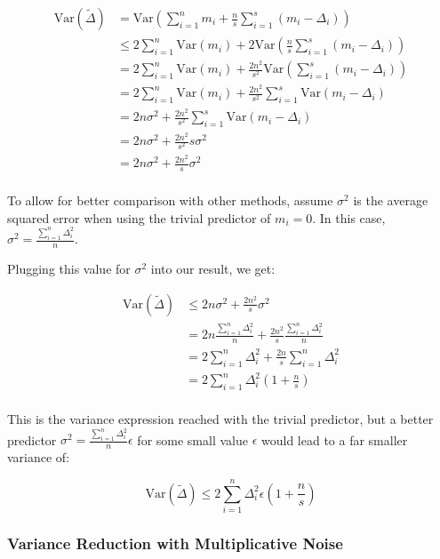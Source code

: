 \documentclass[11pt]{article}
\begin{document}
\[
\begin{aligned}
\mathrm{Var}(\tilde{\Delta}) &= \mathrm{Var}( \sum_{i = 1}^{n} m_i + \frac{n}{s} \sum_{i = 1}^{s} (m_i - \Delta_i)) \\
&\leq 2\sum_{i = 1}^{n} \mathrm{Var}(m_i) + 2\mathrm{Var}(\frac{n}{s} \sum_{i = 1}^{s} (m_i - \Delta_i)) \\
&= 2\sum_{i = 1}^{n} \mathrm{Var}(m_i) + \frac{2n^2}{s^2} \mathrm{Var}(\sum_{i = 1}^{s} (m_i - \Delta_i)) \\
&= 2\sum_{i = 1}^{n} \mathrm{Var}(m_i) + \frac{2n^2}{s^2} \sum_{i = 1}^{s} \mathrm{Var}(m_i - \Delta_i) \\
&= 2n \sigma^2 + \frac{2n^2}{s^2} \sum_{i = 1}^{s} \mathrm{Var}(m_i - \Delta_i) \\
&= 2n \sigma^2 + \frac{2n^2}{s^2} s \sigma^2 \\
&= 2n \sigma^2 + \frac{2n^2}{s} \sigma^2 \\
\end{aligned}
\]

To allow for better comparison with other methods, assume $\sigma^2$ is the average squared error when using the trivial predictor of $m_i = 0$.
In this case, $\sigma^2 = \frac{\sum_{i = 1}^{n}\Delta_i^2}{n}$.

Plugging this value for $\sigma^2$ into our result, we get:

\[
\begin{aligned}
\mathrm{Var}(\tilde{\Delta}) &\leq 2n \sigma^2 + \frac{2n^2}{s} \sigma^2 \\
&= 2n \frac{\sum_{i = 1}^{n}\Delta_i^2}{n} + \frac{2n^2}{s} \frac{\sum_{i = 1}^{n}\Delta_i^2}{n} \\
&= 2\sum_{i = 1}^{n}\Delta_i^2 + \frac{2n}{s} \sum_{i = 1}^{n}\Delta_i^2 \\
&= 2\sum_{i = 1}^{n}\Delta_i^2(1 + \frac{n}{s}) \\
\end{aligned}
\]

This is the variance expression reached with the trivial predictor, but a better predictor $\sigma^2 = \frac{\sum_{i = 1}^{n}\Delta_i^2}{n} \epsilon$ for some small value $\epsilon$ would lead to a far smaller variance of:

\[
\mathrm{Var}(\tilde{\Delta}) \leq 2\sum_{i = 1}^{n}\Delta_i^2 \epsilon (1 + \frac{n}{s})
\]

\subsubsection{Variance Reduction with Multiplicative Noise}
\end{document}
